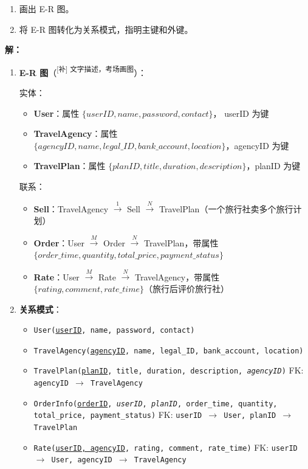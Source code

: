 \documentclass[11pt,a4paper]{article}
\newcommand{\solution}{\par\noindent\textcolor{ansblue}{\textbf{解：}}}
\newcommand{\supp}[1]{\textcolor{ansred}{\textsuperscript{[补] #1}}}
\begin{document}
\begin{enumerate}[label=(\arabic*),leftmargin=*]
  \item 画出 E-R 图。
  \item 将 E-R 图转化为关系模式，指明主键和外键。
\end{enumerate}

\solution

\begin{enumerate}[label=(\arabic*),leftmargin=*]

  \item \textbf{E-R 图}（\supp{文字描述，考场画图}）：

  实体：
  \begin{itemize}[nosep]
    \item \textbf{User}：属性 $\{userID, name, password, contact\}$，
          userID 为键
    \item \textbf{TravelAgency}：属性 $\{agencyID, name, legal\_ID,
          bank\_account, location\}$，agencyID 为键
    \item \textbf{TravelPlan}：属性 $\{planID, title, duration,
          description\}$，planID 为键
  \end{itemize}

  联系：
  \begin{itemize}[nosep]
    \item \textbf{Sell}：TravelAgency $\xrightarrow{1}$ Sell
          $\xrightarrow{N}$ TravelPlan（一个旅行社卖多个旅行计划）
    \item \textbf{Order}：User $\xrightarrow{M}$ Order
          $\xrightarrow{N}$ TravelPlan，带属性 $\{order\_time, quantity,
          total\_price, payment\_status\}$
    \item \textbf{Rate}：User $\xrightarrow{M}$ Rate
          $\xrightarrow{N}$ TravelAgency，带属性 $\{rating, comment,
          rate\_time\}$（旅行后评价旅行社）
  \end{itemize}

  \item \textbf{关系模式}：

  \begin{itemize}[nosep]
    \item \texttt{User(\underline{userID}, name, password, contact)}
    \item \texttt{TravelAgency(\underline{agencyID}, name, legal\_ID,
           bank\_account, location)}
    \item \texttt{TravelPlan(\underline{planID}, title, duration, description,
           \textit{agencyID})}
          \hfill FK: \texttt{agencyID $\to$ TravelAgency}
    \item \texttt{OrderInfo(\underline{orderID}, \textit{userID},
           \textit{planID}, order\_time, quantity, total\_price,
           payment\_status)}
          \hfill FK: \texttt{userID $\to$ User,\; planID $\to$ TravelPlan}
    \item \texttt{Rate(\underline{userID, agencyID}, rating, comment,
           rate\_time)}
          \hfill FK: \texttt{userID $\to$ User,\; agencyID $\to$
           TravelAgency}
  \end{itemize}

\end{enumerate}
\end{document}
